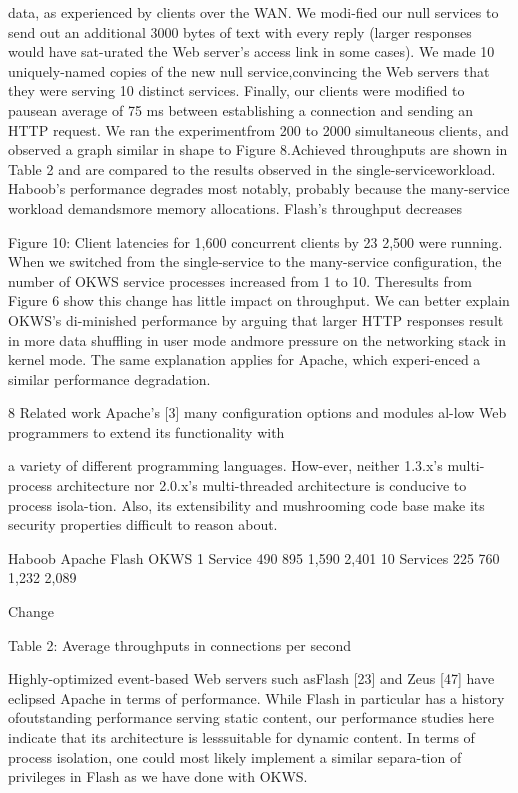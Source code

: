 data, as experienced by clients over the WAN. We modi-fied our null services to send out an additional 3000 bytes
of text with every reply (larger responses would have sat-urated the Web server's access link in some cases). We
made 10 uniquely-named copies of the new null service,convincing the Web servers that they were serving 10 distinct services. Finally, our clients were modified to pausean average of 75 ms between establishing a connection
and sending an HTTP request. We ran the experimentfrom 200 to 2000 simultaneous clients, and observed a
graph similar in shape to Figure 8.Achieved throughputs are shown in Table 2 and are
compared to the results observed in the single-serviceworkload. Haboob's performance degrades most notably,
probably because the many-service workload demandsmore memory allocations. Flash's throughput decreases

Figure 10: Client latencies for 1,600 concurrent clients
by 23%
2,500 were running. When we switched from the single-service to the many-service configuration, the number of
OKWS service processes increased from 1 to 10. Theresults from Figure 6 show this change has little impact on throughput. We can better explain OKWS's di-minished performance by arguing that larger HTTP responses result in more data shuffling in user mode andmore pressure on the networking stack in kernel mode.
The same explanation applies for Apache, which experi-enced a similar performance degradation.

8 Related work
Apache's [3] many configuration options and modules al-low Web programmers to extend its functionality with

a variety of different programming languages. How-ever, neither 1.3.x's multi-process architecture nor 2.0.x's
multi-threaded architecture is conducive to process isola-tion. Also, its extensibility and mushrooming code base
make its security properties difficult to reason about.

Haboob Apache Flash OKWS
1 Service 490 895 1,590 2,401
10 Services 225 760 1,232 2,089

Change %

Table 2: Average throughputs in connections per second

Highly-optimized event-based Web servers such asFlash [23] and Zeus [47] have eclipsed Apache in terms
of performance. While Flash in particular has a history ofoutstanding performance serving static content, our performance studies here indicate that its architecture is lesssuitable for dynamic content. In terms of process isolation, one could most likely implement a similar separa-tion of privileges in Flash as we have done with OKWS.

